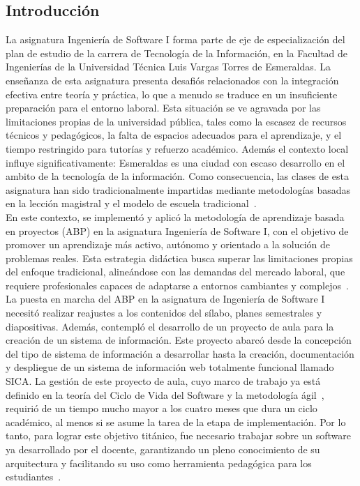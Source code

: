 \documentclass[12pt]{article}
\begin{document}
\begin{multicols}{2}
\section{Introducción}
La asignatura Ingeniería de Software I forma parte de eje de especialización del plan de estudio de la carrera de Tecnología de la Información, en la Facultad de Ingenierías de la Universidad Técnica Luis Vargas Torres de Esmeraldas. La enseñanza de esta asignatura presenta desafiós relacionados con la integración efectiva entre teoría y práctica, lo que a menudo se traduce en un insuficiente preparación para el entorno laboral. Esta situación se ve agravada  por las limitaciones propias de la universidad pública, tales como la escasez de recursos técnicos y pedagógicos, la falta de espacios adecuados para el aprendizaje, y el tiempo  restringido para tutorías y refuerzo académico. Además  el contexto local influye significativamente: Esmeraldas es una ciudad con escaso desarrollo en el ambito de la tecnología de la información. Como consecuencia, las clases de esta asignatura han sido tradicionalmente impartidas mediante metodologías basadas en la lección  magistral y el modelo de escuela tradicional~\cite{yadav2011problem,becker2012modeling}. \\
En este contexto, se implementó y aplicó la metodología de aprendizaje basada en proyectos (ABP) en la asignatura Ingeniería de Software I, con el objetivo de promover un aprendizaje más activo, autónomo y orientado a la solución de problemas reales. Esta estrategia didáctica busca superar las limitaciones propias del enfoque tradicional, alineándose con las demandas del mercado laboral, que requiere profesionales capaces de adaptarse a entornos cambiantes y complejos~\cite{dabbagh2005pedagogical}. \\
La puesta en marcha del ABP en la asignatura de Ingeniería de Software I necesitó realizar reajustes a los contenidos del sílabo, planes semestrales y diapositivas. Además, contempló el desarrollo de un proyecto de aula para la creación de un sistema de información. Este proyecto abarcó desde la concepción del tipo de sistema de información a desarrollar hasta la creación, documentación y despliegue de un sistema de información web totalmente funcional llamado SICA. La gestión de este proyecto de aula, cuyo marco de trabajo ya está definido en la teoría del Ciclo de Vida del Software y la metodología ágil~\cite{sommerville2005}, requirió de un tiempo mucho mayor a los cuatro meses que dura un ciclo académico, al menos si se asume la tarea de la etapa de implementación. Por lo tanto, para lograr este objetivo titánico, fue necesario trabajar sobre un software ya desarrollado por el docente, garantizando un pleno conocimiento de su arquitectura y facilitando su uso como herramienta pedagógica para los estudiantes~\cite{pressman2014software}.\\

\end{multicols}
\end{document}
